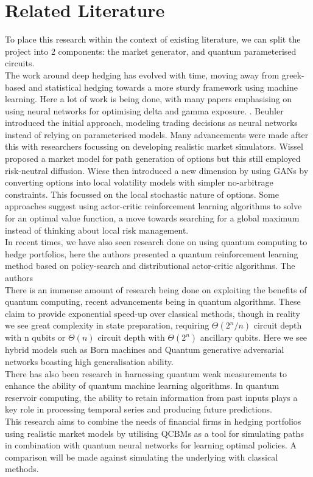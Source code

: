 \documentclass[12pt]{article}
\numberwithin{equation}{section}
\begin{document}
\section{Related Literature}
To place this research within the context of existing literature, we can split 
the project into 2 components: the market generator, and quantum parameterised circuits.
\\
The work around deep hedging has evolved with time, moving away from 
greek-based and statistical hedging towards a more sturdy framework using machine 
learning. Here a lot of work is being done, with many papers emphasising 
on using neural networks for optimising delta and gamma exposure.
\autocite{Enhancing BS delta, Deep Gamma Hedging}.
Beuhler introduced the initial approach, modeling trading decisions 
as neural networks instead of relying on parameterised models.
\autocite{Beuhler Deep Hedging} Many advancements were made after this with 
researchers focussing on developing realistic market simulators. Wissel 
proposed a market model for path generation of options but this still 
employed risk-neutral diffusion. Wiese then introduced 
a new dimension by using GANs by converting options into 
local volatility models with simpler no-arbitrage constraints. This focussed 
on the local stochastic nature of options. 
\autocite{Learning to simulate equity markets}
Some approaches suggest using actor-critic reinforcement learning algorithms to 
solve for an optimal value function, a move towards searching for a global
maximum instead of thinking about local risk management.\autocite{deep bellman}
\\
In recent times, we have also seen research done on using quantum computing to 
hedge portfolios, here the 
authors presented a quantum reinforcement learning method based on policy-search 
and distributional actor-critic algorithms. The authors  \autocite{quantum deep hedging}
\\
There is an immense amount of research being done on exploiting the benefits of 
quantum computing, recent advancements being in quantum algorithms. 
These claim to provide exponential speed-up over classical 
methods, though in reality we see great complexity in state preparation, requiring 
$\Theta(2^n/n)$ circuit depth with n qubits or $\Theta(n)$ circuit depth with 
$\Theta(2^n)$ ancillary qubits. Here we see hybrid models such as Born machines
and Quantum generative adversarial networks boasting high generalisation ability. 
\\
There has also been research in harnessing quantum weak measurements to enhance 
the ability of quantum machine learning algorithms. In quantum reservoir computing,
the ability to retain information from past inputs plays a key role in processing 
temporal series and producing future predictions.\autocite{fujii_quantum_2020}  
\\
This research aims to combine the needs of financial firms in hedging portfolios
using realistic market models by utilising QCBMs as a tool 
for simulating paths in combination with quantum neural networks for learning 
optimal policies. A comparison will be made against simulating the underlying with 
classical methods. 
\end{document}

